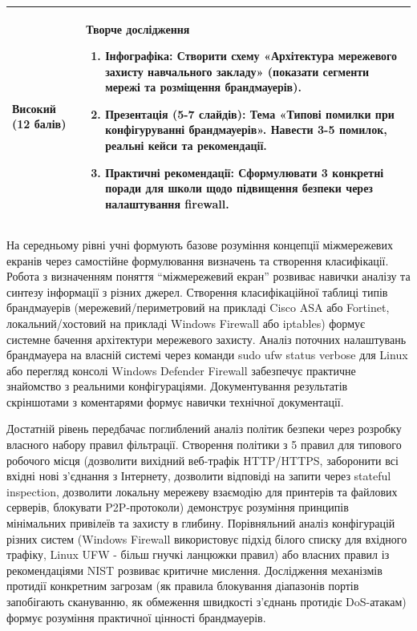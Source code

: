 {\begin{table}[h!]
\begin{tabular}{
  | >{\raggedright\arraybackslash}p{} 
  | >{\raggedright\arraybackslash}p{} |
}
\small \textbf{Високий} (12 балів)&
\small \textbf{Творче дослідження}
\begin{enumerate}
    \item Інфографіка: Створити схему «Архітектура мережевого захисту навчального закладу» (показати сегменти мережі та розміщення брандмауерів).
    \item Презентація (5-7 слайдів): Тема «Типові помилки при конфігуруванні брандмауерів». Навести 3-5 помилок, реальні кейси та рекомендації.
    \item Практичні рекомендації: Сформулювати 3 конкретні поради для школи щодо підвищення безпеки через налаштування firewall.
\end{enumerate} \\ \hline
\end{tabular}
\end{table}
}
На середньому рівні учні формують базове розуміння концепції міжмережевих екранів через самостійне формулювання визначень та створення класифікації. Робота з визначенням поняття ``міжмережевий екран'' розвиває навички аналізу та синтезу інформації з різних джерел. Створення класифікаційної таблиці типів брандмауерів (мережевий/периметровий на прикладі Cisco ASA або Fortinet, локальний/хостовий на прикладі Windows Firewall або iptables) формує системне бачення архітектури мережевого захисту. Аналіз поточних налаштувань брандмауера на власній системі через команди sudo ufw status verbose для Linux або перегляд консолі Windows Defender Firewall забезпечує практичне знайомство з реальними конфігураціями. Документування результатів скріншотами з коментарями формує навички технічної документації.

Достатній рівень передбачає поглиблений аналіз політик безпеки через розробку власного набору правил фільтрації. Створення політики з 5 правил для типового робочого місця (дозволити вихідний веб-трафік HTTP/HTTPS, заборонити всі вхідні нові з'єднання з Інтернету, дозволити відповіді на запити через stateful inspection, дозволити локальну мережеву взаємодію для принтерів та файлових серверів, блокувати P2P-протоколи) демонструє розуміння принципів мінімальних привілеїв та захисту в глибину. Порівняльний аналіз конфігурацій різних систем (Windows Firewall використовує підхід білого списку для вхідного трафіку, Linux UFW - більш гнучкі ланцюжки правил) або власних правил із рекомендаціями NIST розвиває критичне мислення. Дослідження механізмів протидії конкретним загрозам (як правила блокування діапазонів портів запобігають скануванню, як обмеження швидкості з'єднань протидіє DoS-атакам) формує розуміння практичної цінності брандмауерів.

